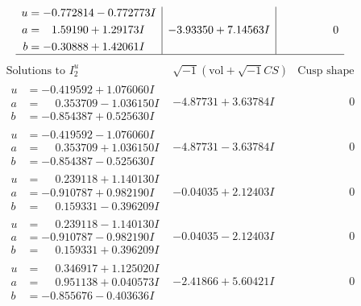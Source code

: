 \documentclass[1p]{elsarticle_modified}
\theoremstyle{definition}
\newcommand{\I}{\sqrt{-1}}
\begin{document}
$$\begin{array}{c|c|c}
\begin{aligned}
u &= -0.772814 - 0.772773 I \\
a &= \phantom{-}1.59190 + 1.29173 I \\
b &= -0.30888 + 1.42061 I\end{aligned}
 & -3.93350 + 7.14563 I & \phantom{-0.000000 } 0\\
 \hline 
 \end{array}$$\newpage$$\begin{array}{c|c|c}  
\text{Solutions to }I^u_{2}& \I (\text{vol} + \sqrt{-1}CS) & \text{Cusp shape}\\
 \hline 
\begin{aligned}
u &= -0.419592 + 1.076060 I \\
a &= \phantom{-}0.353709 - 1.036150 I \\
b &= -0.854387 + 0.525630 I\end{aligned}
 & -4.87731 + 3.63784 I & \phantom{-0.000000 } 0 \\ \hline\begin{aligned}
u &= -0.419592 - 1.076060 I \\
a &= \phantom{-}0.353709 + 1.036150 I \\
b &= -0.854387 - 0.525630 I\end{aligned}
 & -4.87731 - 3.63784 I & \phantom{-0.000000 } 0 \\ \hline\begin{aligned}
u &= \phantom{-}0.239118 + 1.140130 I \\
a &= -0.910787 + 0.982190 I \\
b &= \phantom{-}0.159331 - 0.396209 I\end{aligned}
 & -0.04035 + 2.12403 I & \phantom{-0.000000 } 0 \\ \hline\begin{aligned}
u &= \phantom{-}0.239118 - 1.140130 I \\
a &= -0.910787 - 0.982190 I \\
b &= \phantom{-}0.159331 + 0.396209 I\end{aligned}
 & -0.04035 - 2.12403 I & \phantom{-0.000000 } 0 \\ \hline\begin{aligned}
u &= \phantom{-}0.346917 + 1.125020 I \\
a &= \phantom{-}0.951138 + 0.040573 I \\
b &= -0.855676 - 0.403636 I\end{aligned}
 & -2.41866 + 5.60421 I & \phantom{-0.000000 } 0 \\ \hline\begin{aligned}

\end{aligned}
\end{array}$$
\end{document}
